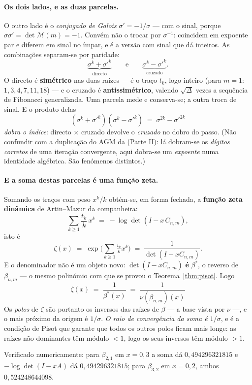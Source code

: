 \documentclass[11pt,a4paper]{article}
\theoremstyle{plain}
\theoremstyle{definition}
\theoremstyle{remark}
\newcommand{\Mat}[1]{\mathcal{M}(#1)}
\providecommand{\Comp}[2]{C_{#1,#2}}
\begin{document}
\paragraph{Os dois lados, e as duas parcelas.} O outro lado é o \emph{conjugado de Galois}
$\sigma' = -1/\sigma$ --- com o sinal, porque $\sigma\sigma' = \det\Mat{m} = -1$. Convém não o
trocar por $\sigma^{-1}$: coincidem em expoente par e diferem em sinal no ímpar, e é a versão com
sinal que dá inteiros. As combinações separam-se por paridade:
\[
  \underbrace{\sigma^k + \sigma'^k}_{\text{directo}} \qquad\text{e}\qquad
  \underbrace{\sigma^k - \sigma'^k}_{\text{cruzado}} .
\]
O directo é \textbf{simétrico} nas duas raízes --- é o traço $t_k$, logo inteiro (para $m=1$:
$1,3,4,7,11,18$) --- e o cruzado é \textbf{antissimétrico}, valendo $\sqrt{\Delta}$ vezes a
sequência de Fibonacci generalizada. Uma parcela mede e conserva-se; a outra troca de sinal. E o
produto delas
\[
  (\sigma^k+\sigma'^k)(\sigma^k-\sigma'^k) \;=\; \sigma^{2k}-\sigma'^{2k}
\]
\emph{dobra o índice}: directo $\times$ cruzado devolve o \emph{cruzado} no dobro do passo. (Não
confundir com a duplicação do AGM da (Parte II): lá dobram-se os \emph{dígitos
corretos} de uma iteração convergente, aqui dobra-se um \emph{expoente} numa identidade algébrica.
São fenómenos distintos.)

\paragraph{E a soma destas parcelas é uma função zeta.} Somando os traços com peso $x^k/k$
obtém-se, em forma fechada, a \textbf{função zeta dinâmica} de Artin--Mazur da companheira:
\[
  \sum_{k\geq1} \frac{t_k}{k}\,x^k \;=\; -\log\det(I - x\,\Comp{n}{m}),
\]
isto é
\[
  \zeta(x) \;=\; \exp\Big(\sum_{k\geq1}\tfrac{t_k}{k}x^k\Big) \;=\; \frac{1}{\det(I - x\Comp{n}{m})} .
\]
E o denominador não é um objeto novo: $\det(I-x\Comp{n}{m})$ \textbf{é} $\beta^*$, o reverso de
$\beta_{n,m}$ --- o mesmo polinómio com que se provou o Teorema~\ref{thm:pisot}. Logo
\[
  \boxed{\;\zeta(x) \;=\; \frac{1}{\beta^*(x)} \;=\; \frac{1}{\nu(\beta_{n,m})(x)}\;}
\]
Os \emph{polos} de $\zeta$ são portanto os inversos das raízes de $\beta$ --- a base vista por
$\nu$ ---, e o mais próximo da origem é $1/\sigma$. \emph{O raio de convergência da soma é
$1/\sigma$}, e é a condição de Pisot que garante que todos os outros polos ficam mais longe: as
raízes não dominantes têm módulo $<1$, logo os seus inversos têm módulo $>1$.

Verificado numericamente: para $\beta_{2,1}$ em $x=0{,}3$ a soma dá $0{,}494296321815$ e
$-\log\det(I-x A)$ dá $0{,}494296321815$; para $\beta_{3,2}$ em $x=0{,}2$, ambos
$0{,}524248644098$.
\end{document}
